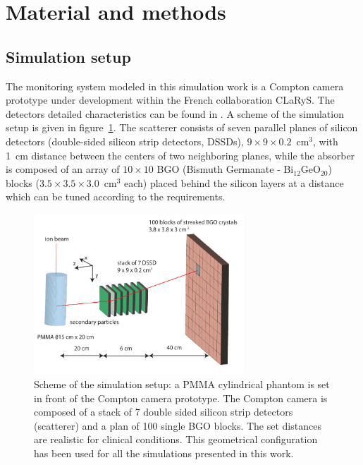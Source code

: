 
\section{Material and methods}

\subsection{Simulation setup}

The monitoring system modeled in this simulation work is a Compton camera prototype under development within the French collaboration CLaRyS. The detectors detailed characteristics can be found in \cite{krimmer:hal-01101334}. A scheme of the simulation setup is given in figure~\ref{fig:fig_setup_CC_simulation_Hadronth}.
The scatterer consists of seven parallel planes of silicon detectors (double-sided silicon strip detectors, DSSDs), $9\times9\times0.2$~cm$^3$, with 1~cm distance between the centers of two neighboring planes, while the absorber is composed of an array of $10\times10$ BGO (Bismuth Germanate - Bi$_{12}$GeO$_{20}$) blocks ($3.5\times3.5\times3.0$~cm$^3$ each) placed behind the silicon layers at a distance which can be tuned according to the requirements.

\begin{figure}	
  \centering
  \includegraphics[width=0.7\textwidth]{./Figure/Compton_Camera_hadontherapy_PMMA_Cylinder_EN.pdf}
  \caption{Scheme of the simulation setup: a PMMA cylindrical phantom is set in front of the Compton camera prototype. The Compton camera is composed of a stack of 7 double sided silicon strip detectors (scatterer) and a plan of 100 single BGO blocks. The set distances are realistic for clinical conditions. This geometrical configuration has been used for all the simulations presented in this work.}
  \label{fig:fig_setup_CC_simulation_Hadronth}
\end{figure}


